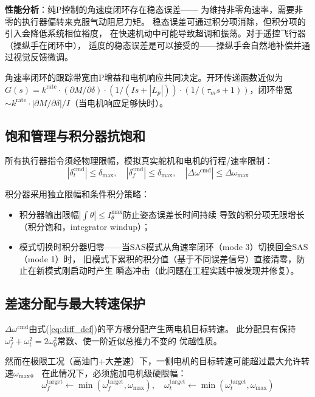 \documentclass[a4paper,12pt]{ctexart}
\theoremstyle{plain}
\theoremstyle{definition}
\begin{document}
\textbf{性能分析}：纯P控制的角速度闭环存在稳态误差——
为维持非零角速率，需要非零的执行器偏转来克服气动阻尼力矩。
稳态误差可通过积分项消除，但积分项的引入会降低系统相位裕度，
在快速机动中可能导致超调和振荡。对于遥控飞行器（操纵手在闭环中），
适度的稳态误差是可以接受的——操纵手会自然地补偿并通过视觉反馈微调。

角速率闭环的跟踪带宽由P增益和电机响应共同决定。开环传递函数近似为
$G(s) = k^{\text{rate}} \cdot (\partial M / \partial \delta) \cdot
(1/(I s + |L_p|)) \cdot (1/(\tau_m s + 1))$，闭环带宽$\sim k^{\text{rate}}
\cdot |\partial M / \partial \delta| / I$（当电机响应足够快时）。

\subsection{饱和管理与积分器抗饱和}

所有执行器指令须经物理限幅，模拟真实舵机和电机的行程/速率限制：
\begin{equation}
    |\delta_t^{\text{cmd}}| \leq \delta_{\max}, \quad
    |\delta_f^{\text{cmd}}| \leq \delta_{\max}, \quad
    |\Delta\omega^{\text{cmd}}| \leq \Delta\omega_{\max}
    \label{eq:actuator_limits}
\end{equation}

积分器采用独立限幅和条件积分策略：
\begin{itemize}
    \item 积分器输出限幅$|\int \theta| \leq I_\theta^{\max}$防止姿态误差长时间持续
          导致的积分项无限增长（积分饱和，integrator windup）；
    \item 模式切换时积分器归零——当SAS模式从角速率闭环（mode 3）切换回全SAS（mode 1）时，
          旧模式下累积的积分值（基于不同误差信号）直接清零，防止在新模式刚启动时产生
          瞬态冲击（此问题在工程实践中被发现并修复）。
\end{itemize}

\subsection{差速分配与最大转速保护}

$\Delta\omega^{\text{cmd}}$由式(\ref{eq:diff_def})的平方根分配产生两电机目标转速。
此分配具有保持$\omega_f^2 + \omega_t^2 = 2\omega_0^2$常数、使一阶近似总推力不变的
优越性质。

然而在极限工况（高油门+大差速）下，一侧电机的目标转速可能超过最大允许转速$\omega_{\max}$。
在此情况下，必须施加电机级硬限幅：
\begin{equation}
    \omega_f^{\text{target}} \leftarrow \min(\omega_f^{\text{target}}, \omega_{\max}), \quad
    \omega_t^{\text{target}} \leftarrow \min(\omega_t^{\text{target}}, \omega_{\max})
    \label{eq:max_clamp}
\end{equation}
\end{document}
